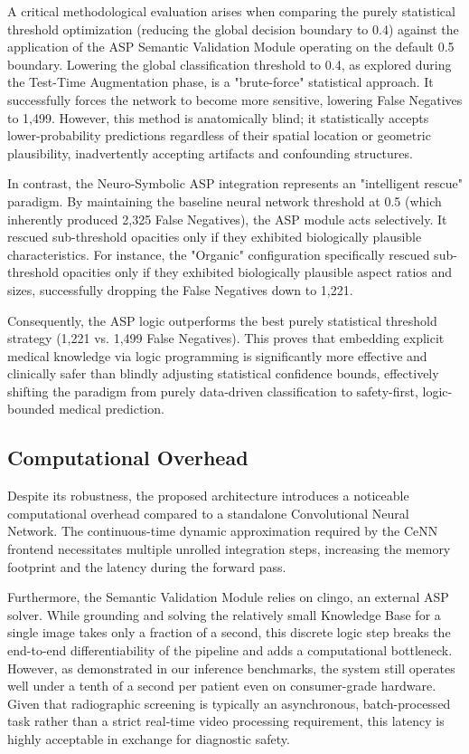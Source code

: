 \documentclass[a4paper,fleqn]{cas-dc}
\begin{document}
A critical methodological evaluation arises when comparing the purely statistical threshold optimization (reducing the global decision boundary to 0.4) against the application of the ASP Semantic Validation Module operating on the default 0.5 boundary. Lowering the global classification threshold to 0.4, as explored during the Test-Time Augmentation phase, is a "brute-force" statistical approach. It successfully forces the network to become more sensitive, lowering False Negatives to 1,499. However, this method is anatomically blind; it statistically accepts lower-probability predictions regardless of their spatial location or geometric plausibility, inadvertently accepting artifacts and confounding structures.

In contrast, the Neuro-Symbolic ASP integration represents an "intelligent rescue" paradigm. By maintaining the baseline neural network threshold at 0.5 (which inherently produced 2,325 False Negatives), the ASP module acts selectively. It rescued sub-threshold opacities only if they exhibited biologically plausible characteristics. For instance, the "Organic" configuration specifically rescued sub-threshold opacities only if they exhibited biologically plausible aspect ratios and sizes, successfully dropping the False Negatives down to 1,221. 

Consequently, the ASP logic outperforms the best purely statistical threshold strategy (1,221 vs. 1,499 False Negatives). This proves that embedding explicit medical knowledge via logic programming is significantly more effective and clinically safer than blindly adjusting statistical confidence bounds, effectively shifting the paradigm from purely data-driven classification to safety-first, logic-bounded medical prediction.

\subsection{Computational Overhead}
Despite its robustness, the proposed architecture introduces a noticeable computational overhead compared to a standalone Convolutional Neural Network. The continuous-time dynamic approximation required by the CeNN frontend necessitates multiple unrolled integration steps, increasing the memory footprint and the latency during the forward pass. 

Furthermore, the Semantic Validation Module relies on clingo, an external ASP solver. While grounding and solving the relatively small Knowledge Base for a single image takes only a fraction of a second, this discrete logic step breaks the end-to-end differentiability of the pipeline and adds a computational bottleneck. However, as demonstrated in our inference benchmarks, the system still operates well under a tenth of a second per patient even on consumer-grade hardware. Given that radiographic screening is typically an asynchronous, batch-processed task rather than a strict real-time video processing requirement, this latency is highly acceptable in exchange for diagnostic safety.
\end{document}

